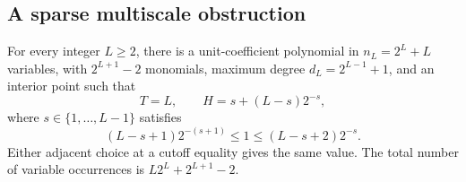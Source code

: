 \subsection{A sparse multiscale obstruction}
\begin{theorem}\label{thm:dyadic-exact}
For every integer $L\ge2$, there is a unit-coefficient polynomial in
$n_L=2^L+L$ variables, with $2^{L+1}-2$ monomials, maximum degree
$d_L=2^{L-1}+1$, and an interior point such that
\begin{equation}\label{eq:dyadic-exact}
 T=L,\qquad H=s+(L-s)2^{-s},
\end{equation}
where $s\in\{1,\ldots,L-1\}$ satisfies
\begin{equation}\label{eq:dyadic-cutoff}
 (L-s+1)2^{-(s+1)}\le1\le(L-s+2)2^{-s}.
\end{equation}
Either adjacent choice at a cutoff equality gives the same value.
The total number of variable occurrences is $L2^L+2^{L+1}-2$.
\end{theorem}
